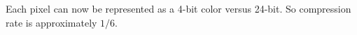 \begin{answer}
    Each pixel can now be represented as a 4-bit color versus 24-bit. So compression rate is approximately $1/6$.
\end{answer}
